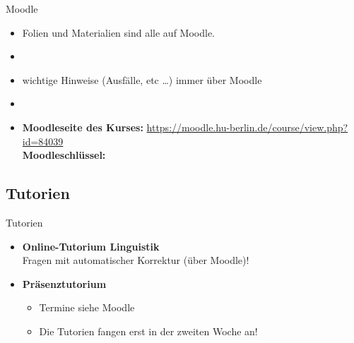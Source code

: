 \begin{frame}{Moodle}

\begin{itemize}
	\item Folien und Materialien sind alle auf Moodle.
	\item[]
	\item wichtige Hinweise (Ausfälle, etc \dots) immer über Moodle
	\item[]
	\item \textbf{Moodleseite des Kurses:} \url{https://moodle.hu-berlin.de/course/view.php?id=84039}\\
	\textbf{Moodleschlüssel:} %
\end{itemize}		

\end{frame}

%
\subsection{Tutorien}

\begin{frame}{Tutorien}

	\begin{itemize}
		\item \textbf{Online-Tutorium Linguistik} \ras\\
                Fragen mit automatischer Korrektur (über Moodle)!\\
		\item \textbf{Präsenztutorium}
		
		\begin{itemize}
			\item Termine siehe Moodle %
			\item Die Tutorien fangen erst in der zweiten Woche an!
		\end{itemize}
		
	\end{itemize}
	
\end{frame}


